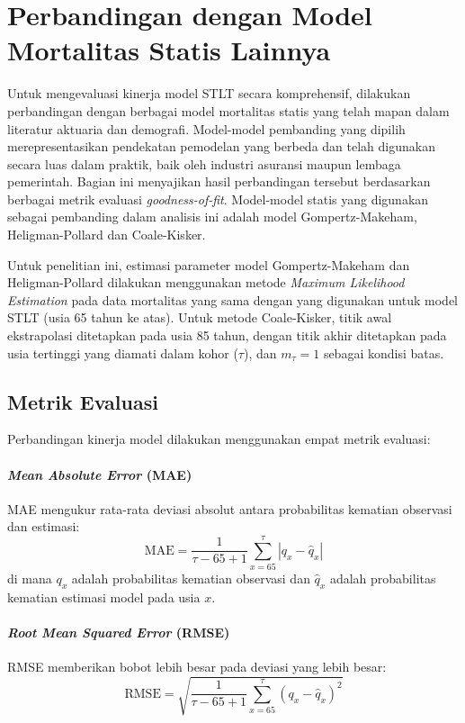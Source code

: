 \section{Perbandingan dengan Model Mortalitas Statis Lainnya}

Untuk mengevaluasi kinerja model STLT secara komprehensif, dilakukan perbandingan dengan berbagai model mortalitas statis yang telah mapan dalam literatur aktuaria dan demografi. Model-model pembanding yang dipilih merepresentasikan pendekatan pemodelan yang berbeda dan telah digunakan secara luas dalam praktik, baik oleh industri asuransi maupun lembaga pemerintah. Bagian ini menyajikan hasil perbandingan tersebut berdasarkan berbagai metrik evaluasi \textit{goodness-of-fit}. Model-model statis yang digunakan sebagai pembanding dalam analisis ini adalah model Gompertz-Makeham, Heligman-Pollard dan Coale-Kisker. 

Untuk penelitian ini, estimasi parameter model Gompertz-Makeham dan Heligman-Pollard dilakukan menggunakan metode \textit{Maximum Likelihood Estimation} pada data mortalitas yang sama dengan yang digunakan untuk model STLT (usia 65 tahun ke atas). Untuk metode Coale-Kisker, titik awal ekstrapolasi ditetapkan pada usia 85 tahun, dengan titik akhir ditetapkan pada usia tertinggi yang diamati dalam kohor ($\tau$), dan $m_\tau = 1$ sebagai kondisi batas.


\subsection{Metrik Evaluasi}

Perbandingan kinerja model dilakukan menggunakan empat metrik evaluasi:

\paragraph{\textit{Mean Absolute Error} (MAE)}
MAE mengukur rata-rata deviasi absolut antara probabilitas kematian observasi dan estimasi:
\begin{equation}
\text{MAE} = \frac{1}{\tau - 65 + 1} \sum_{x=65}^{\tau} |q_x - \hat{q}_x|
\end{equation}
di mana $q_x$ adalah probabilitas kematian observasi dan $\hat{q}_x$ adalah probabilitas kematian estimasi model pada usia $x$.

\paragraph{\textit{Root Mean Squared Error} (RMSE)}
RMSE memberikan bobot lebih besar pada deviasi yang lebih besar:
\begin{equation}
\text{RMSE} = \sqrt{\frac{1}{\tau - 65 + 1} \sum_{x=65}^{\tau} (q_x - \hat{q}_x)^2}
\end{equation}

